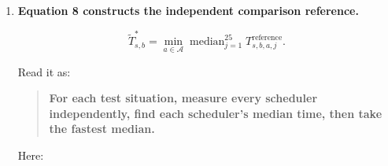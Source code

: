 \documentclass[11pt,a4paper]{article}
\begin{document}
\begin{enumerate}
  \(I\) is the \textbf{identity matrix}: ones down the diagonal, zeros elsewhere.

  \(\lambda\) controls the stabilizing penalty. Without it, a model trained on few examples could learn unstable, extreme coefficients.

  \(w\) controls how strongly the training measurements contribute relative to that penalty.

  We used:

  \[
  w=0.25,\qquad\lambda=1.
  \]

  These values were inherited from the earlier study's training-only validation.

  \(A_a^{-1}\) means the matrix inverse. Its job here is to solve the regression calculation. You do not need to calculate that inverse by hand to explain the study.

  The fitted model is then used through:

  \[
  \text{predicted score for scheduler }a=x^\top\hat\theta_a.
  \]

  That means:

  \begin{quote}
  \textbf{Multiply each feature by its learned coefficient, then add the results.}
  \end{quote}

  Higher predicted score means the model expects better performance relative to STATIC.

  Crucially, Guided 4 uses those predictions to \textbf{shortlist candidates}. Actual timing measurements decide which shortlisted candidate wins.

  Despite the paper's background discussion of contextual bandits, \textbf{this version does not keep learning and switching during useful execution}. It predicts, tests a fixed shortlist, and commits.
\item
  \textbf{Equation 8 constructs the independent comparison reference.}

  \[
  \widetilde T^*_{s,b}
  =
  \min_{a\in\mathcal A}
  \operatorname{median}_{j=1}^{25}
  T^{\mathrm{reference}}_{s,b,a,j}.
  \]

  Read it as:

  \begin{quote}
  \textbf{For each test situation, measure every scheduler independently, find each scheduler's median time, then take the fastest median.}
  \end{quote}

  Here:


\end{enumerate}
\end{document}
